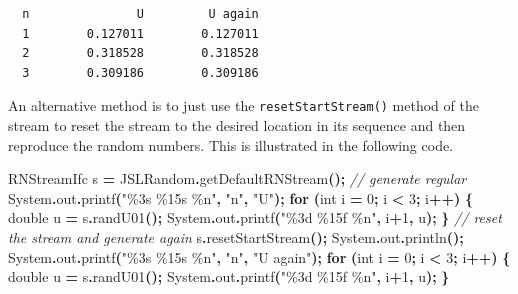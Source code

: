 \documentclass[
]{book}
\newenvironment{Shaded}{\begin{snugshade}}{\end{snugshade}}
\newcommand{\BuiltInTok}[1]{#1}
\newcommand{\CommentTok}[1]{\textcolor[rgb]{0.56,0.35,0.01}{\textit{#1}}}
\newcommand{\ControlFlowTok}[1]{\textcolor[rgb]{0.13,0.29,0.53}{\textbf{#1}}}
\newcommand{\DataTypeTok}[1]{\textcolor[rgb]{0.13,0.29,0.53}{#1}}
\newcommand{\DecValTok}[1]{\textcolor[rgb]{0.00,0.00,0.81}{#1}}
\newcommand{\FunctionTok}[1]{\textcolor[rgb]{0.00,0.00,0.00}{#1}}
\newcommand{\NormalTok}[1]{#1}
\newcommand{\OperatorTok}[1]{\textcolor[rgb]{0.81,0.36,0.00}{\textbf{#1}}}
\newcommand{\SpecialCharTok}[1]{\textcolor[rgb]{0.00,0.00,0.00}{#1}}
\newcommand{\StringTok}[1]{\textcolor[rgb]{0.31,0.60,0.02}{#1}}
\theoremstyle{definition}
\theoremstyle{definition}
\theoremstyle{definition}
\theoremstyle{definition}
\theoremstyle{remark}
\begin{document}
\begin{verbatim}
  n               U         U again 
  1        0.127011        0.127011 
  2        0.318528        0.318528 
  3        0.309186        0.309186 
\end{verbatim}

An alternative method is to just use the \texttt{resetStartStream()} method of the stream to reset the stream to the desired location in its sequence and then reproduce the random numbers. This is illustrated in the following code.

\begin{Shaded}
\begin{Highlighting}[]
\NormalTok{RNStreamIfc s }\OperatorTok{=}\NormalTok{ JSLRandom}\OperatorTok{.}\FunctionTok{getDefaultRNStream}\OperatorTok{();}
\CommentTok{// generate regular}
\BuiltInTok{System}\OperatorTok{.}\FunctionTok{out}\OperatorTok{.}\FunctionTok{printf}\OperatorTok{(}\StringTok{"}\SpecialCharTok{\%3s}\StringTok{ }\SpecialCharTok{\%15s}\StringTok{ }\SpecialCharTok{\%n}\StringTok{"}\OperatorTok{,} \StringTok{"n"}\OperatorTok{,} \StringTok{"U"}\OperatorTok{);}
\ControlFlowTok{for} \OperatorTok{(}\DataTypeTok{int}\NormalTok{ i }\OperatorTok{=} \DecValTok{0}\OperatorTok{;}\NormalTok{ i }\OperatorTok{\textless{}} \DecValTok{3}\OperatorTok{;}\NormalTok{ i}\OperatorTok{++)} \OperatorTok{\{}
    \DataTypeTok{double}\NormalTok{ u }\OperatorTok{=}\NormalTok{ s}\OperatorTok{.}\FunctionTok{randU01}\OperatorTok{();}
    \BuiltInTok{System}\OperatorTok{.}\FunctionTok{out}\OperatorTok{.}\FunctionTok{printf}\OperatorTok{(}\StringTok{"}\SpecialCharTok{\%3d}\StringTok{ }\SpecialCharTok{\%15f}\StringTok{ }\SpecialCharTok{\%n}\StringTok{"}\OperatorTok{,}\NormalTok{ i}\OperatorTok{+}\DecValTok{1}\OperatorTok{,}\NormalTok{ u}\OperatorTok{);}
\OperatorTok{\}}
\CommentTok{// reset the stream and generate again}
\NormalTok{s}\OperatorTok{.}\FunctionTok{resetStartStream}\OperatorTok{();}
\BuiltInTok{System}\OperatorTok{.}\FunctionTok{out}\OperatorTok{.}\FunctionTok{println}\OperatorTok{();}
\BuiltInTok{System}\OperatorTok{.}\FunctionTok{out}\OperatorTok{.}\FunctionTok{printf}\OperatorTok{(}\StringTok{"}\SpecialCharTok{\%3s}\StringTok{ }\SpecialCharTok{\%15s}\StringTok{ }\SpecialCharTok{\%n}\StringTok{"}\OperatorTok{,} \StringTok{"n"}\OperatorTok{,} \StringTok{"U again"}\OperatorTok{);}
\ControlFlowTok{for} \OperatorTok{(}\DataTypeTok{int}\NormalTok{ i }\OperatorTok{=} \DecValTok{0}\OperatorTok{;}\NormalTok{ i }\OperatorTok{\textless{}} \DecValTok{3}\OperatorTok{;}\NormalTok{ i}\OperatorTok{++)} \OperatorTok{\{}
    \DataTypeTok{double}\NormalTok{ u }\OperatorTok{=}\NormalTok{ s}\OperatorTok{.}\FunctionTok{randU01}\OperatorTok{();}
    \BuiltInTok{System}\OperatorTok{.}\FunctionTok{out}\OperatorTok{.}\FunctionTok{printf}\OperatorTok{(}\StringTok{"}\SpecialCharTok{\%3d}\StringTok{ }\SpecialCharTok{\%15f}\StringTok{ }\SpecialCharTok{\%n}\StringTok{"}\OperatorTok{,}\NormalTok{ i}\OperatorTok{+}\DecValTok{1}\OperatorTok{,}\NormalTok{ u}\OperatorTok{);}
\OperatorTok{\}}
\end{Highlighting}
\end{Shaded}
\end{document}
